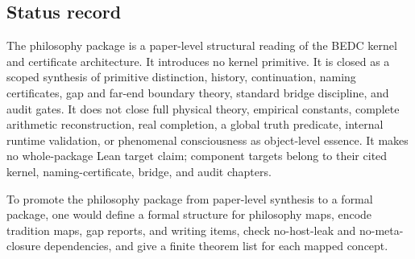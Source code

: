 
\subsection{Status record}
\label{subsec:philosophy-final-status-record}

\begin{definition}
\label{def:philosophy-package-status-record}
The philosophy package is a paper-level structural reading of the BEDC
kernel and certificate architecture. It introduces no kernel
primitive. It is closed as a scoped synthesis of primitive distinction,
history, continuation, naming certificates, gap and far-end boundary
theory, standard bridge discipline, and audit gates. It does not close
full physical theory, empirical constants, complete arithmetic
reconstruction, real completion, a global truth predicate, internal
runtime validation, or phenomenal consciousness as object-level
essence. It makes no whole-package Lean target claim; component
targets belong to their cited kernel, naming-certificate, bridge, and
audit chapters.
\end{definition}

\begin{corollary}
\label{cor:philosophy-package-upgrade-path}
To promote the philosophy package from paper-level synthesis to a
formal package, one would define a formal structure for philosophy
maps, encode tradition maps, gap reports, and writing items, check
no-host-leak and no-meta-closure dependencies, and give a finite
theorem list for each mapped concept.
\end{corollary}
